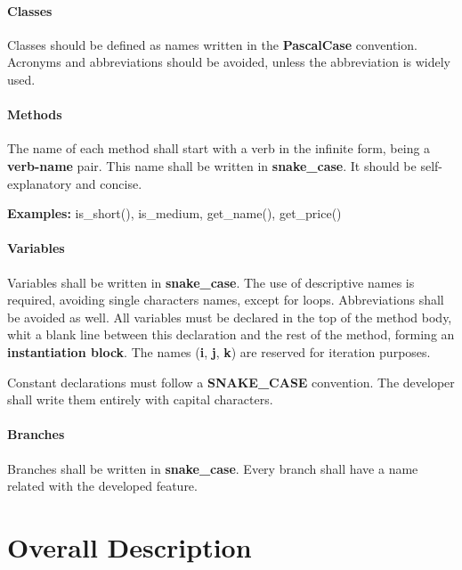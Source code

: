 \documentclass{scrreprt}
\begin{document}
\subsubsection{Classes}

\par Classes should be defined as names written in the \textbf{PascalCase} convention. Acronyms and abbreviations should be avoided, unless the abbreviation is widely used.

\subsubsection{Methods}

\par The name of each method shall start with a verb in the infinite form, being a \textbf{verb-name} pair. This name shall be written in \textbf{snake_case}. It should be self-explanatory and concise.

\par \textbf{Examples:} is_short(), is_medium, get_name(), get_price()

\subsubsection{Variables}

\par Variables shall be written in \textbf{snake_case}. The use of descriptive names is required, avoiding single characters names, except for loops. Abbreviations shall be avoided as well. All variables must be declared in the top of the method body, whit a blank line between this declaration and the rest of the method, forming an \textbf{instantiation block}. The names (\textbf{i}, \textbf{j}, \textbf{k}) are reserved for iteration purposes. 
\par Constant declarations must follow a \textbf{SNAKE_CASE} convention. The developer shall write them entirely with capital characters.


\subsubsection{Branches}

\par Branches shall be written in \textbf{snake_case}. Every branch shall have a name related with the developed feature. 

\chapter{Overall Description}
\end{document}
